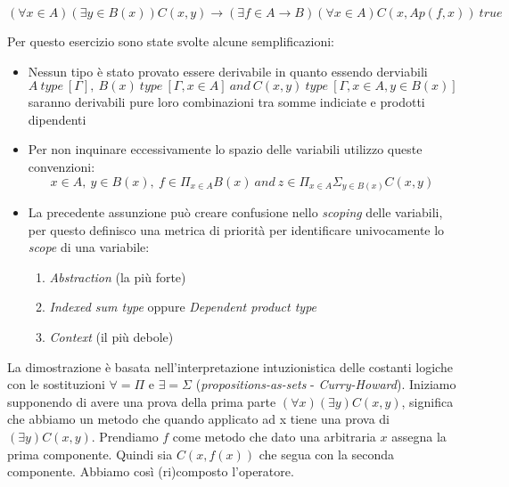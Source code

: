
\begin{displaymath}
    (\forall x \in A)(\exists y \in B(x)) C(x, y) \to (\exists f \in A \to B)(\forall x \in A) C(x, Ap(f, x))\ true
\end{displaymath}

Per questo esercizio sono state svolte alcune semplificazioni:
\begin{itemize}
    \item Nessun tipo è stato provato essere derivabile in quanto essendo derviabili
    \begin{displaymath}
        A\ type\ [\Gamma],\ B(x)\ type\ [\Gamma, x \in A]\ and\ C(x, y)\ type\ [\Gamma, x \in A, y \in B(x)]
    \end{displaymath}
    saranno derivabili pure loro combinazioni tra somme indiciate e prodotti dipendenti
    \item Per non inquinare eccessivamente lo spazio delle variabili utilizzo queste convenzioni:
    \begin{displaymath}
        x \in A,\ y \in B(x),\ f \in \Pi_{x \in A} B(x)\ and\ z \in \Pi_{x \in A} \Sigma_{y \in B(x)} C(x, y)
    \end{displaymath}
    \item La precedente assunzione può creare confusione nello \textit{scoping} delle variabili, per questo definisco una metrica di priorità per identificare univocamente lo \textit{scope} di una variabile:
    \begin{enumerate}
        \item \textit{Abstraction} (la più forte)
        \item \textit{Indexed sum type} oppure \textit{Dependent product type}
        \item \textit{Context} (il più debole)
    \end{enumerate}
\end{itemize}

La dimostrazione è basata nell'interpretazione intuzionistica delle costanti logiche con le sostituzioni $\forall = \Pi$ e $\exists = \Sigma$ (\textit{propositions-as-sets} - \textit{Curry-Howard}). Iniziamo supponendo di avere una prova della prima parte $(\forall x)(\exists y)C(x, y)$, significa che abbiamo un metodo che quando applicato ad x tiene una prova di $(\exists y)C(x, y)$. Prendiamo $f$ come metodo che dato una arbitraria $x$ assegna la prima componente. Quindi sia $C(x, f(x))$ che segua con la seconda componente. Abbiamo così (ri)composto l'operatore.